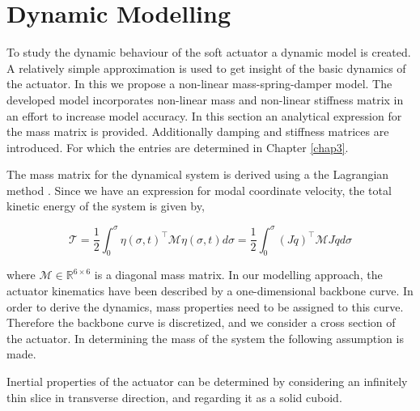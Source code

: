 




\section{Dynamic Modelling}


To study the dynamic behaviour of the soft actuator a dynamic model is created. A relatively simple approximation is used to get insight of the basic dynamics of the actuator. In this we propose a non-linear mass-spring-damper model. The developed model incorporates non-linear mass and non-linear stiffness matrix in an effort to increase model accuracy. In this section an analytical expression for the mass matrix is provided. Additionally damping and stiffness matrices are introduced. For which the entries are determined in Chapter \ref{chap3}.

The mass matrix for the dynamical system is derived using a the Lagrangian method \cite{Caasenbrood2020}. Since we have an expression for modal coordinate velocity, the total kinetic energy of the system is given by,


\begin{equation}
    \mathcal{T} = \frac{1}{2}\int_0^{\sigma} \eta(\sigma,t)^\top \mathcal{M} \eta(\sigma,t) d \sigma  = \frac{1}{2}\int_0^{\sigma} (J \dot{q})^\top \mathcal{M} J\dot{q} d \sigma
    \label{eq2:T}
\end{equation}

where $\mathcal{M} \in \mathbb{R}^{6\times6}$ is a diagonal mass matrix. In our modelling approach, the actuator kinematics have been described by a one-dimensional backbone curve. In order to derive the dynamics, mass properties need to be assigned to this curve. Therefore the backbone curve is discretized, and we consider a cross section of the actuator. In determining the mass of the system the following assumption is made. 

\begin{theorem}
Inertial properties of the actuator can be determined by considering an infinitely thin slice in transverse direction, and regarding it as a solid cuboid.
\end{theorem}


